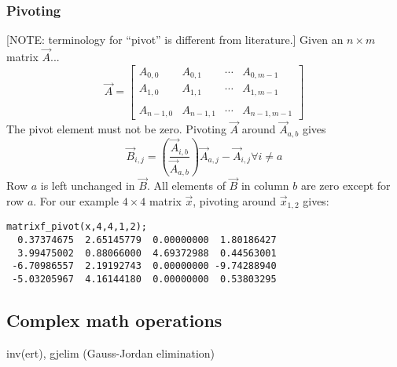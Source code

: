 \subsubsection{Pivoting}
[NOTE: terminology for ``pivot'' is different from literature.]
Given an $n \times m$ matrix $\vec{A}$...
\[
    \vec{A} = 
    \begin{bmatrix}
        A_{0,0}     & A_{0,1}   & \cdots  & A_{0,m-1} \\
        A_{1,0}     & A_{1,1}   & \cdots  & A_{1,m-1} \\
        \\
        A_{n-1,0}   & A_{n-1,1} & \cdots  & A_{n-1,m-1}
    \end{bmatrix}
\]
The pivot element must not be zero.
Pivoting $\vec{A}$ around $\vec{A}_{a,b}$ gives
\[
    \vec{B}_{i,j} = \left(
                    \frac{\vec{A}_{i,b}}{\vec{A}_{a,b}}
                    \right)
                    \vec{A}_{a,j} - \vec{A}_{i,j}
                    \forall i \ne a
\]
Row $a$ is left unchanged in $\vec{B}$.
All elements of $\vec{B}$ in column $b$ are zero except for row $a$.
For our example $4 \times 4$ matrix $\vec{x}$, pivoting around
$\vec{x}_{1,2}$ gives:
\begin{verbatim}
matrixf_pivot(x,4,4,1,2);
  0.37374675  2.65145779  0.00000000  1.80186427
  3.99475002  0.88066000  4.69372988  0.44563001
 -6.70986557  2.19192743  0.00000000 -9.74288940
 -5.03205967  4.16144180  0.00000000  0.53803295
\end{verbatim}

\subsection{Complex math operations}
\label{module:matrix:complex}
inv(ert), gjelim (Gauss-Jordan elimination)


